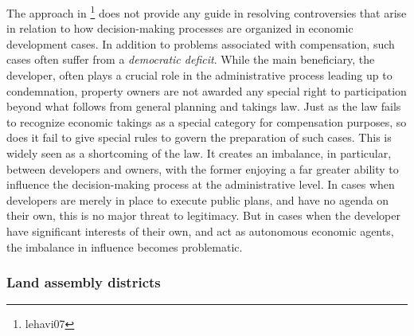 The approach in \footnote{lehavi07} does not provide any guide in resolving controversies that arise in relation to how decision-making processes are organized in economic development cases. In addition to problems associated with compensation, such cases often suffer from a {\it democratic deficit}. While the main beneficiary, the developer, often plays a crucial role in the administrative process leading up to condemnation, property owners are not awarded any special right to participation beyond what follows from general planning and takings law. Just as the law fails to recognize economic takings as a special category for compensation purposes, so does it fail to give special rules to govern the preparation of such cases. This is widely seen as a shortcoming of the law. It creates an imbalance, in particular, between developers and owners, with the former enjoying a far greater ability to influence the decision-making process at the administrative level. In cases when developers are merely in place to execute public plans, and have no agenda on their own, this is no major threat to legitimacy. But in cases when the developer have significant interests of their own, and act as autonomous economic agents, the imbalance in influence becomes problematic.

\subsubsection{Land assembly districts}


